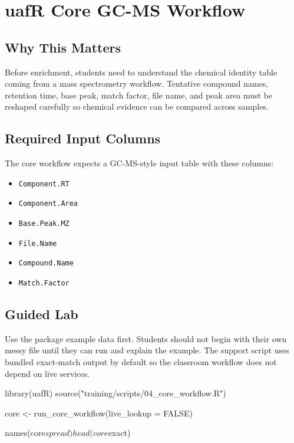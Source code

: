 \chapter{uafR Core GC-MS Workflow}


\section{Why This Matters}
Before enrichment, students need to understand the chemical identity table coming from a mass spectrometry workflow. Tentative compound names, retention time, base peak, match factor, file name, and peak area must be reshaped carefully so chemical evidence can be compared across samples.

\section{Required Input Columns}
The core workflow expects a GC-MS-style input table with these columns:
\begin{itemize}
  \item \texttt{Component.RT}
  \item \texttt{Component.Area}
  \item \texttt{Base.Peak.MZ}
  \item \texttt{File.Name}
  \item \texttt{Compound.Name}
  \item \texttt{Match.Factor}
\end{itemize}

\section{Guided Lab}
Use the package example data first. Students should not begin with their own messy file until they can run and explain the example. The support script uses bundled exact-match output by default so the classroom workflow does not depend on live services.

\begin{rcode}
library(uafR)
source("training/scripts/04_core_workflow.R")

core <- run_core_workflow(live_lookup = FALSE)

names(core$spread)
head(core$exact)
\end{rcode}


